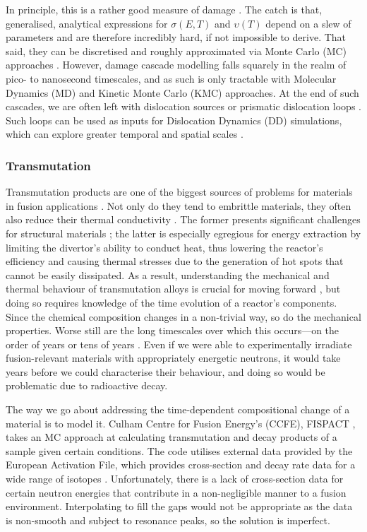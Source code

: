 In principle, this is a rather good measure of damage \cite{dpa}. The catch is that, generalised, analytical expressions for $ \sigma(E,T) $ and $ \upsilon(T) $ depend on a slew of parameters and are therefore incredibly hard, if not impossible to derive. That said, they can be discretised and roughly approximated via Monte Carlo (MC) approaches \cite{srim, srimisbad, dpa}. However, damage cascade modelling falls squarely in the realm of pico- to nanosecond timescales, and as such is only tractable with Molecular Dynamics (MD) and Kinetic Monte Carlo (KMC) \cite{dmg_cascade1, dmg_cascade2} approaches. At the end of such cascades, we are often left with dislocation sources or prismatic dislocation loops \cite{dmg_cascade_dln}. Such loops can be used as inputs for Dislocation Dynamics (DD) simulations, which can explore greater temporal and spatial scales \cite{fusmat1s}.

\subsubsection{Transmutation}
\label{sss:transmutation}

Transmutation products are one of the biggest sources of problems for materials in fusion applications \cite{fusmat1, mats_fusion1}. Not only do they tend to embrittle materials, they often also reduce their thermal conductivity \cite{transmute}. The former presents significant challenges for structural materials \cite{ods_rad_res}; the latter is especially egregious for energy extraction by limiting the divertor's ability to conduct heat, thus lowering the reactor's efficiency and causing thermal stresses due to the generation of hot spots that cannot be easily dissipated. As a result, understanding the mechanical and thermal behaviour of transmutation alloys is crucial for moving forward \cite{nirrhard, colcas, hardening}, but doing so requires knowledge of the time evolution of a reactor's components. Since the chemical composition changes in a non-trivial way, so do the mechanical properties. Worse still are the long timescales over which this occurs---on the order of years or tens of years \cite{transmute2}. Even if we were able to experimentally irradiate fusion-relevant materials with appropriately energetic neutrons, it would take years before we could characterise their behaviour, and doing so would be problematic due to radioactive decay.

The way we go about addressing the time-dependent compositional change of a material is to model it. Culham Centre for Fusion Energy's (CCFE), FISPACT \cite{fispact}, takes an MC approach at calculating transmutation and decay products of a sample given certain conditions. The code utilises external data provided by the European Activation File, which provides cross-section and decay rate data for a wide range of isotopes \cite{fispact_library}. Unfortunately, there is a lack of cross-section data for certain neutron energies that contribute in a non-negligible manner to a fusion environment. Interpolating to fill the gaps would not be appropriate as the data is non-smooth and subject to resonance peaks, so the solution is imperfect.

